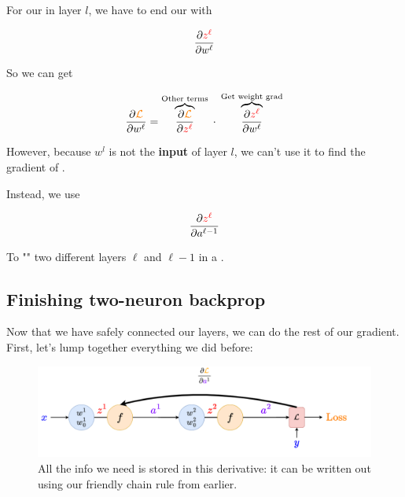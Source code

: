         \begin{concept}
            For our  in layer $l$, we have to end our  with
            
            \begin{equation*}
                \frac{\partial \textcolor{red}{z^\ell}}{\partial w^\ell}
            \end{equation*}
            
            So we can get 
            
            \begin{equation*}
                \frac{\partial \textcolor{orange}{\mathcal{L}}}{\partial w^\ell} 
                =
                \overbrace{
                    \frac{\partial \textcolor{orange}{\mathcal{L}}}{\partial \textcolor{red}{z^\ell}} 
                }^{\text{Other terms} }
                \; \cdot \;  
                \overbrace{
                    \frac{\partial \textcolor{red}{z^\ell}}{\partial w^\ell}
                }^{\text{Get weight grad}}
            \end{equation*}
            
            However, because $w^l$ is not the \textbf{input} of layer $l$, we can't use it to find the gradient of .
            
            Instead, we use 
            
            \begin{equation}
                \frac{\partial \textcolor{red}{z^\ell}}{\partial a^{\ell-1}}
            \end{equation}
            
            To "" two different layers $\ell$ and $\ell-1$ in a .
        \end{concept}
        
            
    \secdiv
    
    \subsection{Finishing two-neuron backprop}
    
        Now that we have safely connected our layers, we can do the rest of our gradient. First, let's lump together everything we did before:
        
        \begin{figure}[H]
            \centering
            \includegraphics[width=120mm,scale=0.4]{images/nn_1_5_images/two_neurons_inside_bp4.png}
            \caption*{All the info we need is stored in this derivative: it can be written out using our friendly chain rule from earlier.}
        \end{figure}
        
